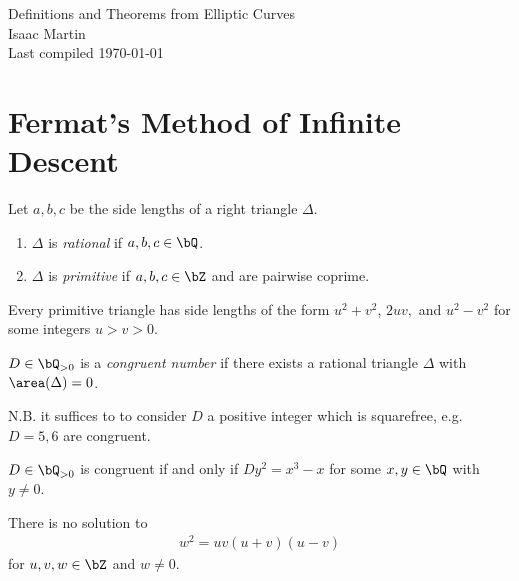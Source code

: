 


\begin{center}
	\LARGE
	Definitions and Theorems from Elliptic Curves\\
	\Large
	Isaac Martin \\
    Last compiled \today
\end{center}
\normalsize
\vspace{-2mm}
\hru

\tableofcontents
\newpage

\section{Fermat's Method of Infinite Descent}
\begin{defn}\label{defn:triangle-definitions}
Let $a,b,c$ be the side lengths of a right triangle $\Delta$.
	\begin{enumerate}
		\item $\Delta$ is \emph{rational} if $a,b,c \in \bQ$.
		\item $\Delta$ is \emph{primitive} if $a,b,c \in \bZ$ and are pairwise coprime.
	\end{enumerate}
\end{defn}

\begin{lem}[Lemma 1.1]\label{lem:form-for-prim-triangles}
	Every primitive triangle has side lengths of the form $u^2+v^2$, $2uv,$ and $u^2 - v^2$ for some integers $u > v > 0$.
\end{lem}
\begin{defn}\label{defn:congruent-number}
	$D\in \bQ_{>0}$ is a \emph{congruent number} if there exists a rational triangle $\Delta$ with $\area(\Delta) = 0$. 
\end{defn}
N.B. it suffices to to consider $D$ a positive integer which is squarefree, e.g. $D = 5, 6$ are congruent.

\begin{lem}[Lemma 1.2]\label{lem:congruent-number-condition}
	$D \in \bQ_{>0}$ is congruent if and only if $Dy^{2}=x^3 - x$ for some $x,y \in \bQ$ with $y \neq 0$.
\end{lem}

\begin{thm}
	There is no solution to 
	\begin{align*}
		w^2 = uv(u+v)(u-v)
	\end{align*}
	for $u,v,w \in \bZ$ and $w \neq 0$.
\end{thm}

